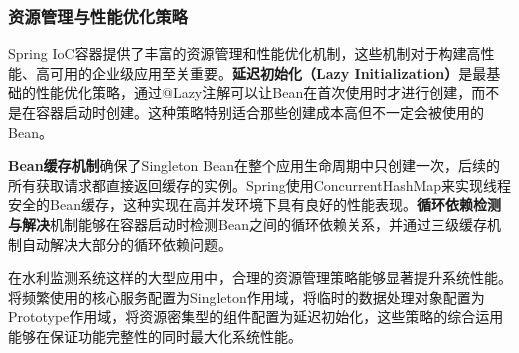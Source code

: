 \subsubsection{资源管理与性能优化策略}\label{ux8d44ux6e90ux7ba1ux7406ux4e0eux6027ux80fdux4f18ux5316ux7b56ux7565}

Spring IoC容器提供了丰富的资源管理和性能优化机制，这些机制对于构建高性能、高可用的企业级应用至关重要。\textbf{延迟初始化（Lazy Initialization）}是最基础的性能优化策略，通过@Lazy注解可以让Bean在首次使用时才进行创建，而不是在容器启动时创建。这种策略特别适合那些创建成本高但不一定会被使用的Bean。

\textbf{Bean缓存机制}确保了Singleton Bean在整个应用生命周期中只创建一次，后续的所有获取请求都直接返回缓存的实例。Spring使用ConcurrentHashMap来实现线程安全的Bean缓存，这种实现在高并发环境下具有良好的性能表现。\textbf{循环依赖检测与解决}机制能够在容器启动时检测Bean之间的循环依赖关系，并通过三级缓存机制自动解决大部分的循环依赖问题。

在水利监测系统这样的大型应用中，合理的资源管理策略能够显著提升系统性能。将频繁使用的核心服务配置为Singleton作用域，将临时的数据处理对象配置为Prototype作用域，将资源密集型的组件配置为延迟初始化，这些策略的综合运用能够在保证功能完整性的同时最大化系统性能。

